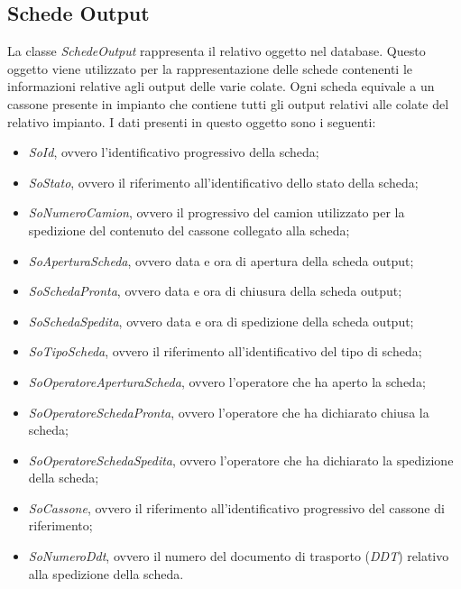   \subsection{Schede Output}
  La classe \textit{SchedeOutput} rappresenta il relativo oggetto nel database. Questo oggetto viene utilizzato per la
  rappresentazione delle schede contenenti le informazioni relative agli output delle varie colate. Ogni scheda equivale
  a un cassone presente in impianto che contiene tutti gli output relativi alle colate del relativo impianto. I dati
  presenti in questo oggetto sono i seguenti:
  \begin{itemize}
    \item \textit{SoId}, ovvero l'identificativo progressivo della scheda;
    \item \textit{SoStato}, ovvero il riferimento all'identificativo dello stato della scheda;
    \item \textit{SoNumeroCamion}, ovvero il progressivo del camion utilizzato per la spedizione del contenuto del
    cassone collegato alla scheda;
    \item \textit{SoAperturaScheda}, ovvero data e ora di apertura della scheda output;
    \item \textit{SoSchedaPronta}, ovvero data e ora di chiusura della scheda output;
    \item \textit{SoSchedaSpedita}, ovvero data e ora di spedizione della scheda output;
    \item \textit{SoTipoScheda}, ovvero il riferimento all'identificativo del tipo di scheda;
    \item \textit{SoOperatoreAperturaScheda}, ovvero l'operatore che ha aperto la scheda;
    \item \textit{SoOperatoreSchedaPronta}, ovvero l'operatore che ha dichiarato chiusa la scheda;
    \item \textit{SoOperatoreSchedaSpedita}, ovvero l'operatore che ha dichiarato la spedizione della scheda;
    \item \textit{SoCassone}, ovvero il riferimento all'identificativo progressivo del cassone di riferimento;
    \item \textit{SoNumeroDdt}, ovvero il numero del documento di trasporto (\textit{DDT}) relativo alla spedizione
    della scheda.
  \end{itemize}

